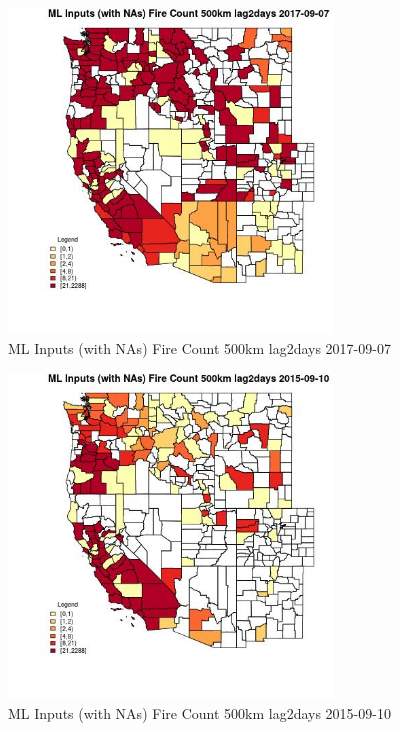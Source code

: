 \begin{figure} 
\centering  
\includegraphics[width=0.77\textwidth]{Code_Outputs/Report_ML_input_PM25_Step4_part_e_de_duplicated_aves_compiled_2019-05-21wNAs_CountyFire_Count_500km_lag2daysMean2017-09-07.jpg} 
\caption{\label{fig:Report_ML_input_PM25_Step4_part_e_de_duplicated_aves_compiled_2019-05-21wNAsCountyFire_Count_500km_lag2daysMean2017-09-07}ML Inputs (with NAs) Fire Count 500km lag2days 2017-09-07} 
\end{figure} 
 

\begin{figure} 
\centering  
\includegraphics[width=0.77\textwidth]{Code_Outputs/Report_ML_input_PM25_Step4_part_e_de_duplicated_aves_compiled_2019-05-21wNAs_CountyFire_Count_500km_lag2daysMean2015-09-10.jpg} 
\caption{\label{fig:Report_ML_input_PM25_Step4_part_e_de_duplicated_aves_compiled_2019-05-21wNAsCountyFire_Count_500km_lag2daysMean2015-09-10}ML Inputs (with NAs) Fire Count 500km lag2days 2015-09-10} 
\end{figure} 
 

